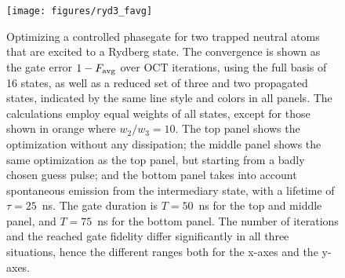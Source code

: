 \begin{figure}[tb] %
  \centering
 \texttt{[image: figures/ryd3\_favg]}
 \caption{Optimizing a controlled phasegate for two trapped neutral
   atoms that are excited to a Rydberg state. The convergence is shown
   as the gate error $1-F_{\operatorname{avg}}$ over OCT iterations, using  the full basis of
   16 states, as well as a reduced set of three and two propagated states,
   indicated by the same line style and colors in all panels.  The
   calculations employ equal weights of all states, except for those shown in
   orange where $w_2 / w_3 = 10$.  The top panel shows the optimization without
   any dissipation; the middle panel shows the same optimization as the top
   panel, but starting from a badly chosen guess pulse; and the bottom panel
   takes into account spontaneous emission from the intermediary state, with
   a lifetime of $\tau = 25$~ns. The gate duration is $T=50$~ns for the top and
   middle panel, and $T=75$~ns for the bottom panel. The number of iterations
   and the reached gate fidelity differ significantly in all three situations,
   hence the different ranges both for the x-axes and the y-axes.}
  \label{fig:ryd3_favg}
\end{figure}

